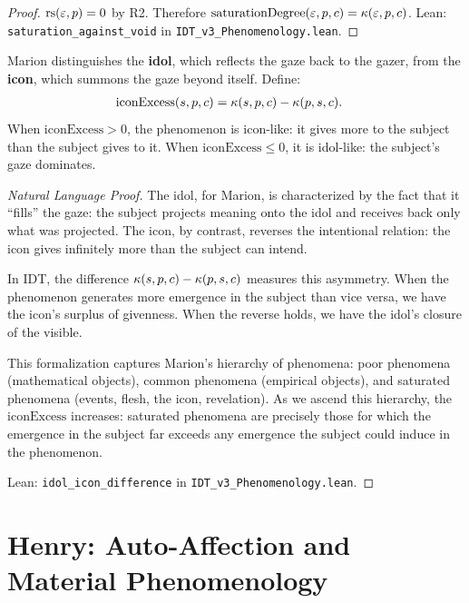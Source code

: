 \begin{proof}
$\mathrm{rs}(\varepsilon, p) = 0$ by R2.  Therefore $\mathrm{saturationDegree}(\varepsilon, p, c)
= \kappa(\varepsilon, p, c)$.
Lean: \texttt{saturation\_against\_void} in \texttt{IDT\_v3\_Phenomenology.lean}.
\end{proof}

\begin{theorem}
\label{thm:idol-icon}
Marion distinguishes the \textbf{idol}, which reflects the gaze back to the
gazer, from the \textbf{icon}, which summons the gaze beyond itself.  Define:
\begin{align}
\mathrm{iconExcess}(s, p, c) &= \kappa(s, p, c) - \kappa(p, s, c).
\end{align}
When $\mathrm{iconExcess} > 0$, the phenomenon is icon-like: it gives more to
the subject than the subject gives to it.  When $\mathrm{iconExcess} \leq 0$,
it is idol-like: the subject's gaze dominates.
\end{theorem}

\begin{proof}[Natural Language Proof]
The idol, for Marion, is characterized by the fact that it ``fills'' the gaze:
the subject projects meaning onto the idol and receives back only what was
projected.  The icon, by contrast, reverses the intentional relation: the icon
gives infinitely more than the subject can intend.

In IDT, the difference $\kappa(s, p, c) - \kappa(p, s, c)$ measures this
asymmetry.  When the phenomenon generates more emergence in the subject than
vice versa, we have the icon's surplus of givenness.  When the reverse holds,
we have the idol's closure of the visible.

This formalization captures Marion's hierarchy of phenomena: poor phenomena
(mathematical objects), common phenomena (empirical objects), and saturated
phenomena (events, flesh, the icon, revelation).  As we ascend this hierarchy,
the $\mathrm{iconExcess}$ increases: saturated phenomena are precisely those
for which the emergence in the subject far exceeds any emergence the subject
could induce in the phenomenon.

Lean: \texttt{idol\_icon\_difference} in \texttt{IDT\_v3\_Phenomenology.lean}.
\end{proof}

\section{Henry: Auto-Affection and Material Phenomenology}

